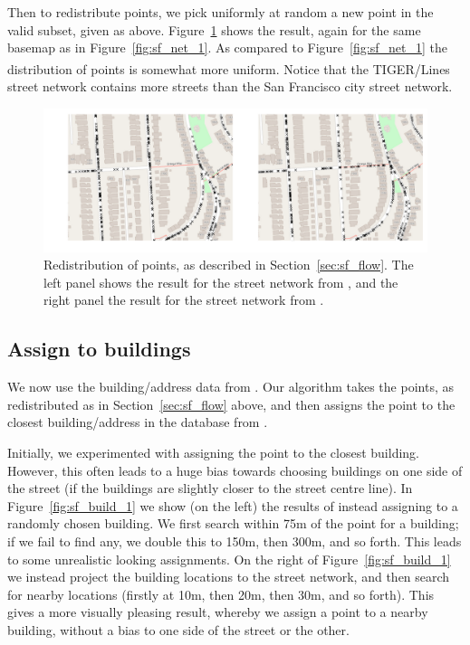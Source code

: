 \documentclass[twoside,a4paper,twocolumn,10pt]{article}
\theoremstyle{plain}
\theoremstyle{definition}
\newcommand{\regsym}{\textsuperscript{\textregistered}}
\begin{document}
Then to redistribute points, we pick uniformly at random a new point in the valid subset,
given as above.  Figure~\ref{fig:sf_flow_redist} shows the result, again for the same
basemap as in Figure~\ref{fig:sf_net_1}.  As compared to Figure~\ref{fig:sf_net_1} the
distribution of points is somewhat more uniform.  Notice that the TIGER/Lines\regsym
street network contains more streets than the San Francisco city street network.

\begin{figure}
  \includegraphics[width=\textwidth]{sf_redist_flow_network.png}
  \caption{Redistribution of points, as described in Section~\ref{sec:sf_flow}.
The left panel shows the result for the street network from \cite{sfgeo}, and the right
panel the result for the street network from \cite{tiger}.}
  \label{fig:sf_flow_redist}
\end{figure}


\subsection{Assign to buildings}\label{sec:sf_assign_to_buildings}

We now use the building/address data from \cite{oa}.  Our algorithm takes the points,
as redistributed as in Section~\ref{sec:sf_flow} above, and then assigns the point to
the closest building/address in the database from \cite{oa}.

Initially, we experimented with assigning the point to the closest building.  However,
this often leads to a huge bias towards choosing buildings on one side of the street
(if the buildings are slightly closer to the street centre line).  In Figure~\ref{fig:sf_build_1}
we show (on the left) the results of instead assigning to a randomly chosen building.  We
first search within 75m of the point for a building; if we fail to find any, we double this
to 150m, then 300m, and so forth.  This leads to some unrealistic looking assignments.
On the right of Figure~\ref{fig:sf_build_1} we instead project the building locations to the
street network, and then search for nearby locations (firstly at 10m, then 20m, then 30m,
and so forth).  This gives a more visually pleasing result, whereby we assign a point to
a nearby building, without a bias to one side of the street or the other.
\end{document}
